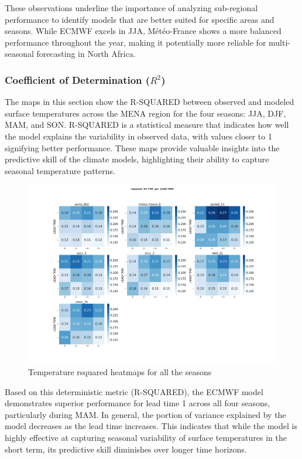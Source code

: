 These observations underline the importance of analyzing sub-regional performance to identify models that are better suited for specific areas and seasons. While ECMWF excels in JJA, Météo-France shows a more balanced performance throughout the year, making it potentially more reliable for multi-seasonal forecasting in North Africa.





\subsubsection{Coefficient of Determination (\( R^2 \))}
The maps in this section show the R-SQUARED between observed and modeled surface temperatures across the MENA region for the four seasons: JJA, DJF, MAM, and SON. R-SQUARED is a statistical measure that indicates how well the model explains the variability in observed data, with values closer to 1 signifying better performance. These maps provide valuable insights into the predictive skill of the climate models, highlighting their ability to capture seasonal temperature patterns.

\begin{figure}[H]
    \centering
    \includegraphics[width=1\linewidth]{plots/det/rsquared/rsquared_T2M_mena.png}
    \caption{Temperature rsquared heatmaps for all the seasons}
\end{figure}

Based on this deterministic metric (R-SQUARED), the ECMWF model demonstrates superior performance for lead time 1 across all four seasons, particularly during MAM. In general, the portion of variance explained by the model decreases as the lead time increases. This indicates that while the model is highly effective at capturing seasonal variability of surface temperatures in the short term, its predictive skill diminishes over longer time horizons.

